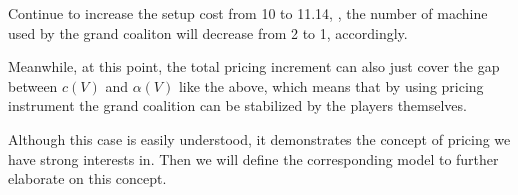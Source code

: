 Continue to increase the setup cost from 10 to 11.14, , the number of machine used by the grand coaliton will decrease from 2 to 1, accordingly.

Meanwhile, at this point, the total pricing increment can also just cover the gap between $c(V)$ and $\alpha(V)$ like the above, which means that by using pricing instrument the grand coalition can be stabilized by the players themselves.

Although this case is easily understood, it demonstrates the concept of pricing we have strong interests in. Then we will define the corresponding model to further elaborate on this concept.
